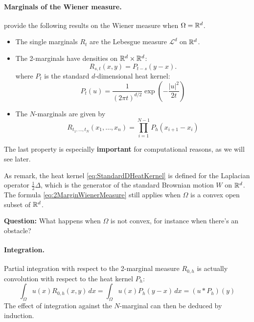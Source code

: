 \documentclass[../report.tex]{subfiles}
\begin{document}
\paragraph{Marginals of the Wiener measure.} \textcite{benamou2018entropy} provide the following results on the Wiener measure when $\Omega = \mathbb{R}^d$.
\begin{itemize}
	\item The single marginals $R_t$ are the Lebesgue measure $\mathcal{L}^d$ on $\mathbb{R}^d$.
	\item The 2-marginals have densities on $\mathbb{R}^d \times \mathbb{R}^d$:
	\begin{equation}\label{eq:2MarginWienerMeasure}
		R_{s,t}(x,y) = P_{t-s}(y-x).
	\end{equation}
	where $P_t$ is the standard $d$-dimensional heat kernel:
	\begin{equation}\label{eq:StandardDHeatKernel}
		P_t(u) =
		\frac{1}{(2\pi t)^{d/2}} \exp\left(
		-\frac{|u|^2}{2t}
		\right)
	\end{equation}
	\item The $N$-marginals are given by
	\begin{equation}
		R_{t_1,\ldots,t_N}(x_1,\ldots,x_n) = 
		\prod_{i=1}^{N-1}
		P_{h}(x_{i+1}-x_i)
	\end{equation}
\end{itemize}
The last property is especially \textbf{important} for computational reasons, as we will see later.

\begin{remark}
	As \textcite[p.~5]{benamou2018entropy} remark, the heat kernel \eqref{eq:StandardDHeatKernel} is defined for the Laplacian operator $\frac{1}{2}\Delta$, which is the generator of the standard Brownian motion $W$ on $\mathbb{R}^d$. The formula \eqref{eq:2MarginWienerMeasure} still applies when $\Omega$ is a convex open subset of $\mathbb{R}^d$.
	
	\textbf{Question:} What happens when $\Omega$ is not convex, for instance when there's an obstacle?
\end{remark}


\paragraph{Integration.} Partial integration with respect to the 2-marginal measure $R_{0,h}$ is actually convolution with respect to the heat kernel $P_h$:
\[
	\int_\Omega u(x) R_{0,h}(x,y)\,dx =
	\int_\Omega u(x) P_h(y-x)\,dx =
	(u * P_h)(y)
\]
The effect of integration against the $N$-marginal can then be deduced by induction.
\end{document}

